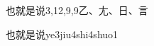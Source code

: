 \begin{entry}{也就是说}{3,12,9,9}{⼄、⼪、⽇、⾔}
  \begin{phonetics}{也就是说}{ye3jiu4shi4shuo1}
  \end{phonetics}
\end{entry}
